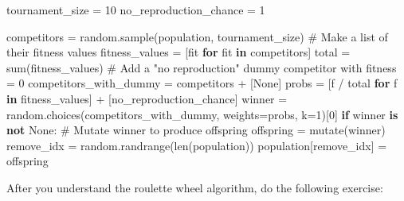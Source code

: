 \documentclass[
  letterpaper,
  DIV=11,
  numbers=noendperiod]{scrreprt}
\newenvironment{Shaded}{\begin{snugshade}}{\end{snugshade}}
\newcommand{\BuiltInTok}[1]{\textcolor[rgb]{0.00,0.23,0.31}{#1}}
\newcommand{\CommentTok}[1]{\textcolor[rgb]{0.37,0.37,0.37}{#1}}
\newcommand{\ControlFlowTok}[1]{\textcolor[rgb]{0.00,0.23,0.31}{\textbf{#1}}}
\newcommand{\DecValTok}[1]{\textcolor[rgb]{0.68,0.00,0.00}{#1}}
\newcommand{\KeywordTok}[1]{\textcolor[rgb]{0.00,0.23,0.31}{\textbf{#1}}}
\newcommand{\NormalTok}[1]{\textcolor[rgb]{0.00,0.23,0.31}{#1}}
\newcommand{\OperatorTok}[1]{\textcolor[rgb]{0.37,0.37,0.37}{#1}}
\newcommand{\VariableTok}[1]{\textcolor[rgb]{0.07,0.07,0.07}{#1}}
\theoremstyle{definition}
\theoremstyle{remark}
\begin{document}
\begin{tcolorbox}[enhanced jigsaw, left=2mm, opacitybacktitle=0.6, toptitle=1mm, colbacktitle=quarto-callout-note-color!10!white, toprule=.15mm, coltitle=black, colframe=quarto-callout-note-color-frame, opacityback=0, title=\textcolor{quarto-callout-note-color}{\faInfo}\hspace{0.5em}{Roulette wheel algorithm}, breakable, bottomtitle=1mm, rightrule=.15mm, titlerule=0mm, arc=.35mm, leftrule=.75mm, bottomrule=.15mm, colback=white]

\begin{Shaded}
\begin{Highlighting}[]
\NormalTok{  tournament\_size }\OperatorTok{=} \DecValTok{10}  
\NormalTok{  no\_reproduction\_chance }\OperatorTok{=} \DecValTok{1}
  
\NormalTok{  competitors }\OperatorTok{=}\NormalTok{ random.sample(population, tournament\_size)}
  \CommentTok{\# Make a list of their fitness values}
\NormalTok{  fitness\_values }\OperatorTok{=}\NormalTok{ [fit }\ControlFlowTok{for}\NormalTok{ fit }\KeywordTok{in}\NormalTok{ competitors]}
\NormalTok{  total }\OperatorTok{=} \BuiltInTok{sum}\NormalTok{(fitness\_values)}
  \CommentTok{\# Add a "no reproduction" dummy competitor with fitness = 0}
\NormalTok{  competitors\_with\_dummy }\OperatorTok{=}\NormalTok{ competitors }\OperatorTok{+}\NormalTok{ [}\VariableTok{None}\NormalTok{]}
\NormalTok{  probs }\OperatorTok{=}\NormalTok{ [f }\OperatorTok{/}\NormalTok{ total }\ControlFlowTok{for}\NormalTok{ f }\KeywordTok{in}\NormalTok{ fitness\_values] }\OperatorTok{+}\NormalTok{ [no\_reproduction\_chance]}
\NormalTok{  winner }\OperatorTok{=}\NormalTok{ random.choices(competitors\_with\_dummy, weights}\OperatorTok{=}\NormalTok{probs, k}\OperatorTok{=}\DecValTok{1}\NormalTok{)[}\DecValTok{0}\NormalTok{]}
  \ControlFlowTok{if}\NormalTok{ winner }\KeywordTok{is} \KeywordTok{not} \VariableTok{None}\NormalTok{:}
      \CommentTok{\# Mutate winner to produce offspring}
\NormalTok{      offspring }\OperatorTok{=}\NormalTok{ mutate(winner)}
\NormalTok{      remove\_idx }\OperatorTok{=}\NormalTok{ random.randrange(}\BuiltInTok{len}\NormalTok{(population))}
\NormalTok{      population[remove\_idx] }\OperatorTok{=}\NormalTok{ offspring  }
        
\end{Highlighting}
\end{Shaded}

\end{tcolorbox}

After you understand the roulette wheel algorithm, do the following
exercise:
\end{document}
